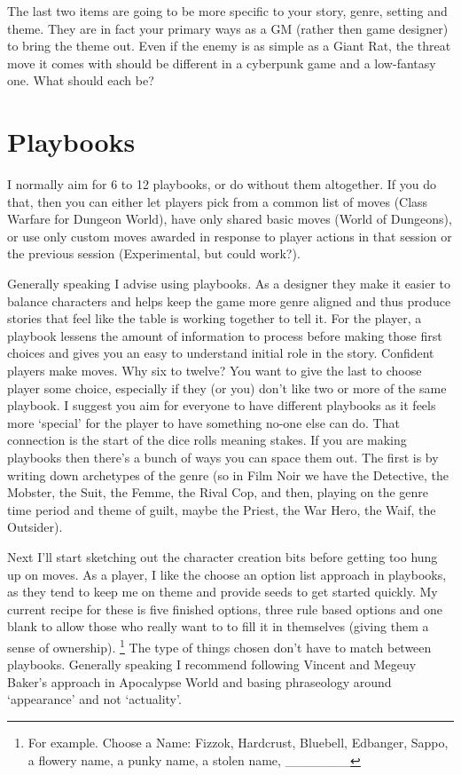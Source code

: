 \documentclass{tufte-handout}
\begin{document}
The last two items are going to be more specific to your story, genre, setting and theme. They are in fact your primary ways as a GM (rather then game designer) to bring the theme out.  Even if the enemy is as simple as a Giant Rat, the threat move it comes with should be different in a cyberpunk game and a low-fantasy one. What should each be?

\section{Playbooks}
I normally aim for 6 to 12 playbooks, or do without them altogether. If you do that, then you can either let  players pick from a common list of moves (Class Warfare for Dungeon World), have only shared basic moves (World of Dungeons), or use only custom moves awarded in response to player actions in that session or the previous session (Experimental, but could work?).

Generally speaking I advise using playbooks. As a designer they make it easier to balance characters and helps keep the game more genre aligned and thus produce stories that feel like the table is working together to tell it. For the player, a playbook lessens the amount of information to process before making those first choices and gives you an easy to understand initial role in the story. Confident players make moves.
Why six to twelve? You want to give the last to choose player some choice, especially if they (or you) don't like two or more of the same playbook. I suggest you aim for everyone to have different playbooks as it feels more `special' for the player to have something no-one else can do. That connection is the start of the dice rolls meaning stakes.
If you are making playbooks then there's a bunch of ways you can space them out.  The first is by writing down archetypes of the genre (so in Film Noir we have the Detective, the Mobster, the Suit, the Femme, the Rival Cop, and then, playing on the genre time period and theme of guilt, maybe the Priest, the War Hero, the Waif, the Outsider). 

Next I'll start sketching out the character creation bits before getting too hung up on moves. 
As a player, I like the choose an option list approach in playbooks, as they tend to keep me on theme and provide seeds to get started quickly. My current recipe for these is five finished options, three rule based options and one blank to allow those who really want to to fill it in themselves (giving them a sense of ownership). \footnote{For example. Choose a Name: Fizzok, Hardcrust, Bluebell, Edbanger, Sappo, a flowery name, a punky name, a stolen name, \_\_\_\_\_\_\_}  The type of things chosen don't have to match between playbooks. Generally speaking I recommend following Vincent and Megeuy Baker's approach in Apocalypse World and basing phraseology around `appearance' and not `actuality'. 
\end{document}
